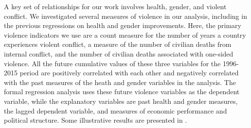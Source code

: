 \documentclass[12pt]{article}
\begin{document}
A key set of relationships for our work involves health, gender, and violent conflict. We investigated several measures of violence in our analysis, including in the previous regressions on health and gender improvements. Here, the primary violence indicators we use are a count measure for the number of years a country experiences violent conflict, a measure of the number of civilian deaths from internal conflict, and the number of civilian deaths associated with one-sided violence. All the future cumulative values of these three variables for the 1996-2015 period are positively correlated with each other and negatively correlated with the past measures of the heath and gender variables in the analysis. The formal regression analysis uses these future violence variables as the dependent variable, while the explanatory variables are past health and gender measures, the lagged dependent variable, and measures of economic performance and political structure. Some illustrative results are presented in .
\end{document}
